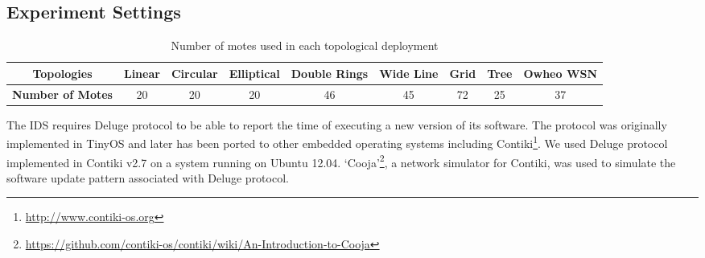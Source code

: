 \documentclass[conference]{IEEEtran}
\newcommand{\notedme}[1]{\raisebox{0pt}[0pt][0pt]{\pdfcomment[open=true,color=blue]{#1}}}
\newcommand*{\bd}[1]{\multicolumn{1}{|c|}{\bfseries #1}}
\begin{document}




\subsection*{Experiment Settings}
\label{subsec:sim_env}
\begin{table}[t!]
\centering
\begin{tabular}{|p{2.5cm}|c |c |c |c |c |c |c |c |}
\hline
\bd{Topologies}           & \bd{Linear} & \bd{Circular} & \bd{Elliptical} & \bd{Double Rings} & \bd{Wide Line} & \bd{Grid} & \bd{Tree} & \bd{Owheo WSN}   \\
\hline
\bd{Number of Motes}           & 20 & 20 & 20 & 46 & 45 & 72 & 25 & 37   \\
\hline
\end{tabular}
\caption{Number of motes used in each topological deployment}
\label{tab:topos}
\end{table}

The IDS requires Deluge protocol to be able to report the time of executing  a new version of its software.
The protocol was originally implemented in TinyOS and later has been ported to other embedded operating systems including Contiki\footnote{\url{http://www.contiki-os.org}}. 
We used Deluge protocol implemented in Contiki v2.7 on a system running on Ubuntu 12.04.
`Cooja'\footnote{\url{https://github.com/contiki-os/contiki/wiki/An-Introduction-to-Cooja}}, a network simulator for Contiki, was used to simulate the software update pattern associated with Deluge protocol.
\end{document}
